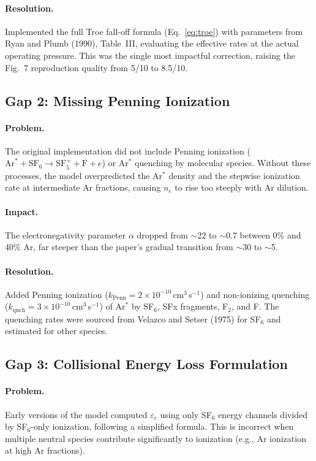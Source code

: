 \documentclass[11pt,a4paper]{article}
\newcommand{\SFsix}{\mathrm{SF}_6}
\newcommand{\SFfive}{\mathrm{SF}_5}
\newcommand{\Ar}{\mathrm{Ar}}
\newcommand{\nelec}{n_e}
\begin{document}
\paragraph{Resolution.} Implemented the full Troe fall-off formula (Eq.~\ref{eq:troe}) with parameters from Ryan and Plumb (1990), Table~III, evaluating the effective rates at the actual operating pressure.  This was the single most impactful correction, raising the Fig.~7 reproduction quality from 5/10 to 8.5/10.

\subsection{Gap 2: Missing Penning Ionization}

\paragraph{Problem.} The original implementation did not include Penning ionization ($\Ar^* + \SFsix \to \SFfive^+ + \mathrm{F} + e$) or Ar$^*$ quenching by molecular species.  Without these processes, the model overpredicted the Ar$^*$ density and the stepwise ionization rate at intermediate Ar fractions, causing $\nelec$ to rise too steeply with Ar dilution.

\paragraph{Impact.} The electronegativity parameter $\alpha$ dropped from $\sim$22 to $\sim$0.7 between 0\% and 40\% Ar, far steeper than the paper's gradual transition from $\sim$30 to $\sim$5.

\paragraph{Resolution.} Added Penning ionization ($k_\mathrm{Penn} = 2 \times 10^{-10}$\,cm$^3$\,s$^{-1}$) and non-ionizing quenching ($k_\mathrm{qnch} = 3 \times 10^{-10}$\,cm$^3$\,s$^{-1}$) of Ar$^*$ by SF$_6$, SFx fragments, F$_2$, and F.  The quenching rates were sourced from Velazco and Setser (1975) for SF$_6$ and estimated for other species.

\subsection{Gap 3: Collisional Energy Loss Formulation}

\paragraph{Problem.} Early versions of the model computed $\varepsilon_c$ using only SF$_6$ energy channels divided by SF$_6$-only ionization, following a simplified formula.  This is incorrect when multiple neutral species contribute significantly to ionization (e.g., Ar ionization at high Ar fractions).
\end{document}
